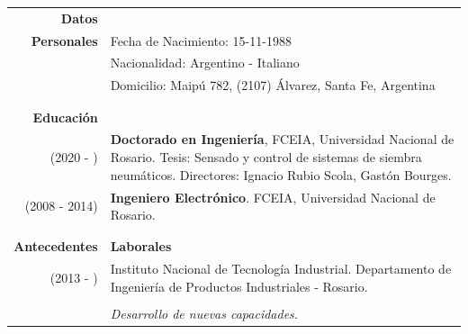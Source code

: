 \documentclass[a4paper,10pt, sans]{article}
\begin{document}
  \vspace{0.5cm}
  \large
  \begin{table}[h!]
  \begin{tabularx}{\textwidth}{r X}
    \textbf{Datos} & {}  \\ [1ex]
      \textbf{Personales} & Fecha de Nacimiento: 15-11-1988 \\ [1ex]
      {} & Nacionalidad: Argentino - Italiano \\ [1ex]
      {} & Domicilio: Maipú 782, (2107) Álvarez, Santa Fe, Argentina \\ \\ \hline \\

    
    \textbf{Educación} & {} \\ [1ex]
       (2020 - ) & \textbf{Doctorado en Ingeniería}, FCEIA, Universidad Nacional de Rosario. Tesis: Sensado y control de sistemas de siembra neumáticos. Directores: Ignacio Rubio Scola, Gastón Bourges.\\ [1ex]
       (2008 - 2014) & \textbf{Ingeniero Electrónico}. FCEIA, Universidad Nacional de Rosario.\\ \\ \hline \\
    \textbf{Antecedentes} & \textbf{Laborales} \\ [1ex]
      (2013 - ) & Instituto Nacional de Tecnología Industrial. Departamento de Ingeniería de Productos Industriales - Rosario.\\ \\
            
        {} & \hspace{2cm} \textit{Desarrollo de nuevas capacidades.} \\ [1ex]
        

\end{tabularx}
\end{table}
\end{document}
